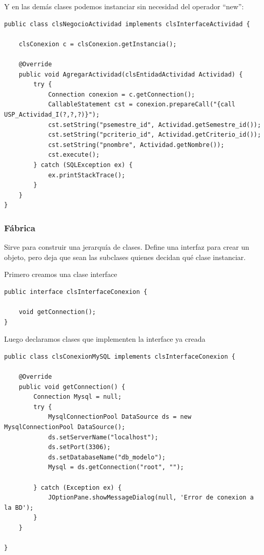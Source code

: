 \documentclass[twoside,twocolumn]{article}
\begin{document}
Y en las demás clases podemos instanciar sin necesidad del operador “new”:
\lstset{breaklines=true,style=sharpc}
\begin{lstlisting}
public class clsNegocioActividad implements clsInterfaceActividad {

    clsConexion c = clsConexion.getInstancia();

    @Override
    public void AgregarActividad(clsEntidadActividad Actividad) {
        try {
            Connection conexion = c.getConnection();
            CallableStatement cst = conexion.prepareCall("{call USP_Actividad_I(?,?,?)}");
            cst.setString("psemestre_id", Actividad.getSemestre_id());
            cst.setString("pcriterio_id", Actividad.getCriterio_id());
            cst.setString("pnombre", Actividad.getNombre());
            cst.execute();
        } catch (SQLException ex) {
            ex.printStackTrace();
        }
    }
}
\end{lstlisting}
\subsubsection{ Fábrica }


Sirve para construir una jerarquía de clases. Define una interfaz para crear un objeto, pero deja que sean las subclases quienes decidan qué clase instanciar. 


Primero creamos una clase interface
\lstset{breaklines=true,style=sharpc}
\begin{lstlisting}
public interface clsInterfaceConexion {

    void getConnection();
}
\end{lstlisting}


Luego declaramos clases que implementen la interface ya creada
\lstset{breaklines=true,style=sharpc}
\begin{lstlisting}
public class clsConexionMySQL implements clsInterfaceConexion {

    @Override
    public void getConnection() {
        Connection Mysql = null;
        try {
            MysqlConnectionPool DataSource ds = new MysqlConnectionPool DataSource();
            ds.setServerName("localhost");
            ds.setPort(3306);
            ds.setDatabaseName("db_modelo");
            Mysql = ds.getConnection("root", "");

        } catch (Exception ex) {
            JOptionPane.showMessageDialog(null, 'Error de conexion a la BD');
        }
    }
    
}
\end{lstlisting}
\end{document}
